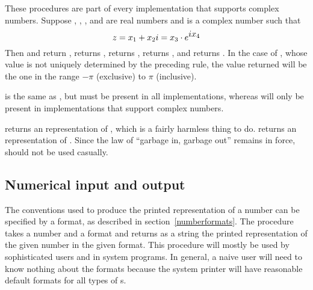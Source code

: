 \begin{entry}{%
}

These procedures are part of every implementation that supports complex
numbers.  Suppose , , , and  are
real numbers and  is a complex number such that
 $$ \vr{z} = \vri{x} + \vrii{x}\hbox{$i$}
 = \vriii{x} \cdot e^{{\displaystyle{\hbox{$i$}} \vriv{x}}}$$
Then  and  return ,
 returns ,  returns ,
 returns , and  returns .
In the case of , whose value is not uniquely determined by
the preceding rule, the value returned will be the one in the range
$-\pi$ (exclusive) to $\pi$ (inclusive).

\begin{note}  is the same as , but 
must be present in all implementations, whereas  will
only be present in implementations that support complex numbers.
\end{note}

\end{entry}


\begin{entry}{%
}

 returns an  representation of ,
which is a fairly harmless thing to do.   returns an
 representation of .  Since the law of ``garbage in,
garbage out'' remains in force,  should not be used
casually.

\end{entry}

\medskip

\subsection{Numerical input and output}


\begin{entry}{%
}

The conventions used to produce the printed representation of a number can
be specified by a format, as described in section~\ref{numberformats}.
The procedure  takes a
number and a format and returns as a string the printed representation of
the given number in the given format.  This procedure will mostly be
used by sophisticated users and in system programs.  In general, a naive
user will need to know nothing about the formats because the system
printer will have reasonable default formats for all types of
s.

\end{entry}


